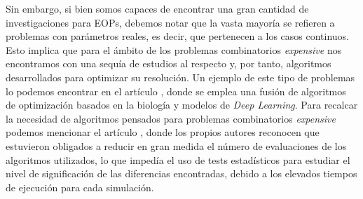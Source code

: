 
Sin embargo, si bien somos capaces de encontrar una gran cantidad de investigaciones para EOPs, debemos notar que la vasta mayoría se refieren a problemas con parámetros reales, es decir, que pertenecen a los casos continuos. 
Esto implica que para el ámbito de los problemas combinatorios \textit{expensive} nos encontramos con una sequía de estudios al respecto y, por tanto, algoritmos desarrollados para optimizar su resolución. 
Un ejemplo de este tipo de problemas lo podemos encontrar en el artículo \parencite{martinezLightsShadowsEvolutionary2021b}, donde se emplea una fusión de algoritmos de optimización basados en la biología y modelos de \textit{Deep Learning}. 
Para recalcar la necesidad de algoritmos pensados para problemas combinatorios \textit{expensive} podemos mencionar el artículo \parencite{poyatosEvoPruneDeepTLEvolutionaryPruning2023a}, donde los propios autores reconocen que estuvieron obligados a reducir en gran medida el número de evaluaciones de los algoritmos utilizados, lo que impedía el uso de tests estadísticos para estudiar el nivel de significación de las diferencias encontradas, debido a los elevados tiempos de ejecución para cada simulación. 


